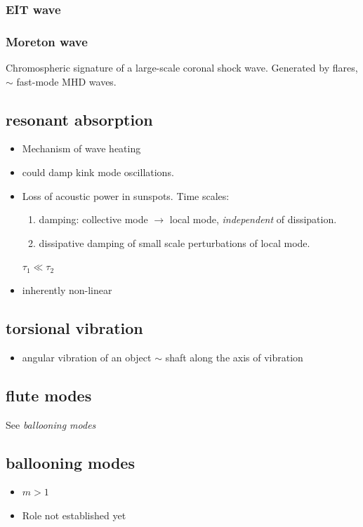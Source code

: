 \documentclass{article}
\begin{document}
\subsubsection{EIT wave}
\subsubsection{Moreton wave}
Chromospheric signature of a large-scale coronal shock wave. Generated
by flares, $\sim$ fast-mode MHD waves.

\subsection{resonant absorption}
\begin{itemize}
    \item Mechanism of wave heating
    \item could damp kink mode oscillations.
    \item Loss of acoustic power in sunspots. Time scales:
        \begin{enumerate}
            \item damping: collective mode $\rightarrow$ local mode,
                \emph{independent} of dissipation.
            \item dissipative damping of small scale perturbations of local
                mode.
        \end{enumerate}
        $\tau_1 \ll \tau_2$
    \item inherently non-linear
\end{itemize}





\subsection{torsional vibration}
\begin{itemize}
    \item angular vibration of an object $\sim$ shaft along the
        axis of vibration
\end{itemize}

\subsection{flute modes}
See \emph{ballooning modes}
\subsection{ballooning modes}
\begin{itemize}
    \item $m > 1$
    \item Role not established yet
\end{itemize}
\end{document}
